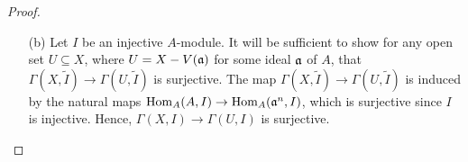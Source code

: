 \documentclass[a4paper]{article}
\begin{document}
\begin{enumerate} [label=\textbf{\arabic*.}, leftmargin=0em]
\begin{proof}
\begin{itemize} [leftmargin=0cm]
\begin{align*}
                                                      & = \frac{f_j^n \alpha(f_i^n)}{(f_if_j)^n}            \\
                                                      & = \frac{f_i^n \alpha(f_j^n)}{(f_if_j)^n}            \\
                                                      & = \restr{\alpha_j(1)}{U_i \cap U_j}.
                  \end{align*}
                  Also, each $\phi_n$ is injective, so the induced map $\phi : \varinjlim_n \Hom_A(\goth{a}^n, M) \to \Gamma(U, \widetilde{M})$ is injective.
                  It remains to show $\phi$ is surjective.
                  Let $s \in \Gamma(U, \widetilde{M})$ be any section.
                  For each $i$, we can express $\restr{s}{U_i}$ as $m_i/f_i^{n_i}$ for some $n_i > 0$ and $m_i \in M$ such that $\restr{m_i/f_i^{n_i}}{U_i \cap U_j} = \restr{m_j/f_j^{n_j}}{U_i \cap U_j}$, where $U_i \cap U_j = \spec{A_{f_if_j}}$ for all $i, j$.
                  Choose $n = n_i$ that works for all $i$, so we have
                  \begin{equation*}
                    \frac{f_j^n m_i}{(f_if_j)^n} = \frac{f_i^n m_j}{(f_if_j)^n}.
                  \end{equation*}
                  We want to show there exists an $A$-homomoprhism $\alpha : \goth{a}^N \to M$ for some $N \geq n$ such that $\alpha_i(1) = f_i^{N-n} m_i / f_i^N$.
                  Imitating the proof of (3.3), let $\goth{b}_1 \subseteq \goth{b}_2 \subseteq \cdots$ be the sequence of annihilators of $\cdots \subseteq \goth{a}^2 \subseteq \goth{a}$.
                  Since $A$ is Noetherian, there is an $r$ such that $\goth{b}_r = \goth{b}_{r + 1} = \cdots$.
                  Define $\sigma : \goth{a}^{n + r} \to M$ by sending $f_i^{n + r}$ to $f_i^r m_i$ for all $i$ and extending by zero.
                  This is a well-defined homomorphism because the annihilator of $f_i^{n + r}$ is $\goth{b}_{n + r} = \goth{b}_r$, and $\goth{b}_r$ annihilates $f_i^r m_i$.
                  Hence, $\phi_{n + r}(\sigma) = s$.

            \item[(b)] Let $I$ be an injective $A$-module.
                  It will be sufficient to show for any open set $U \subseteq X$, where $U = X - V(\mathfrak{a})$ for some ideal $\mathfrak{a}$ of $A$, that $\Gamma(X, \tilde{I}) \to \Gamma(U, \tilde{I})$ is surjective.
                  The map $\Gamma(X, \tilde{I}) \to \Gamma(U, \tilde{I})$ is induced by the natural maps $\operatorname{Hom}_A(A, I) \to \operatorname{Hom}_A(\mathfrak{a}^n, I)$, which is surjective since $I$ is injective.
                  Hence, $\Gamma(X, I) \to \Gamma(U, I)$ is surjective.
          \end{itemize}
        \end{proof}

\end{enumerate}
\end{document}
